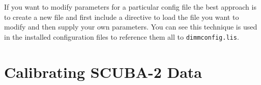 \documentclass[twoside,11pt]{starlink}
\begin{document}
\begin{description}



\end{description}

If you want to modify parameters for a particular config file the best
approach is to create a new file and first include a directive to load
the file you want to modify and then supply your own parameters. You
can see this technique is used in the installed configuration files to
reference them all to \texttt{dimmconfig.lis}.

\section{Calibrating SCUBA-2 Data}
\label{sec:calib}
\end{document}

